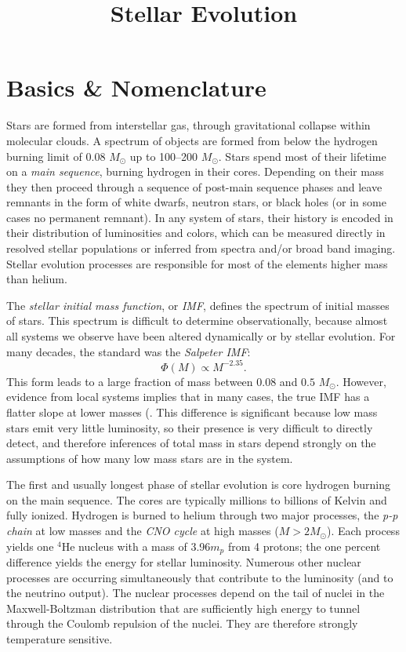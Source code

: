 \title{\bf Stellar Evolution}

\section{Basics \& Nomenclature}

Stars are formed from interstellar gas, through gravitational collapse
within molecular clouds. A spectrum of objects are formed from below
the hydrogen burning limit of 0.08 $M_\odot$ up to 100--200
$M_\odot$. Stars spend most of their lifetime on a {\it main
sequence}, burning hydrogen in their cores. Depending on their mass
they then proceed through a sequence of post-main sequence phases and
leave remnants in the form of white dwarfs, neutron stars, or black
holes (or in some cases no permanent remnant). In any system of stars,
their history is encoded in their distribution of luminosities and
colors, which can be measured directly in resolved stellar populations
or inferred from spectra and/or broad band imaging. Stellar evolution
processes are responsible for most of the elements higher mass than
helium.

The {\it stellar initial mass function}, or {\it IMF}, defines the
spectrum of initial masses of stars. This spectrum is difficult to
determine observationally, because almost all systems we observe have
been altered dynamically or by stellar evolution. For many decades,
the standard was the {\it Salpeter IMF}:
\begin{equation}
\Phi(M) \propto M^{-2.35}.
\end{equation}
This form leads to a large fraction of mass between $0.08$ and $0.5$
$M_\odot$. However, evidence from local systems implies that in many
cases, the true IMF has a flatter slope at lower masses
(\citealt{bastian10a}. This difference is significant because low mass
stars emit very little luminosity, so their presence is very difficult
to directly detect, and therefore inferences of total mass in stars
depend strongly on the assumptions of how many low mass stars are in
the system.

The first and usually longest phase of stellar evolution is core
hydrogen burning on the main sequence. The cores are typically
millions to billions of Kelvin and fully ionized. Hydrogen is burned
to helium through two major processes, the {\it p-p chain} at low
masses and the {\it CNO cycle} at high masses ($M>2 M_\odot$). Each
process yields one ${}^4$He nucleus with a mass of 3.96$m_p$ from 4
protons; the one percent difference yields the energy for stellar
luminosity. Numerous other nuclear processes are occurring
simultaneously that contribute to the luminosity (and to the neutrino
output). The nuclear processes depend on the tail of nuclei in the
Maxwell-Boltzman distribution that are sufficiently high energy to
tunnel through the Coulomb repulsion of the nuclei. They are therefore
strongly temperature sensitive.

